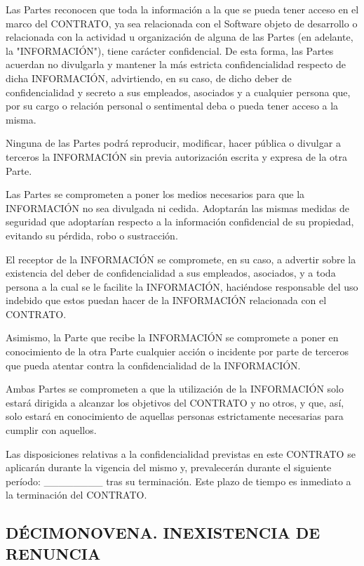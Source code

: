 \documentclass[a4paper,11pt]{report}
\begin{document}
	Las Partes reconocen que toda la información a la que se pueda tener
	acceso en el marco del CONTRATO, ya sea relacionada con el Software
	objeto de desarrollo o relacionada con la actividad u organización de
	alguna de las Partes (en adelante, la "{INFORMACIÓN}"), tiene carácter
	confidencial. De esta forma, las Partes acuerdan no divulgarla y
	mantener la más estricta confidencialidad respecto de dicha INFORMACIÓN,
	advirtiendo, en su caso, de dicho deber de confidencialidad y secreto a
	sus empleados, asociados y a cualquier persona que, por su cargo o
	relación personal o sentimental deba o pueda tener acceso a la misma.

	Ninguna de las Partes podrá reproducir, modificar, hacer pública o
	divulgar a terceros la INFORMACIÓN sin previa autorización escrita y
	expresa de la otra Parte.

	Las Partes se comprometen a poner los medios necesarios para que la
	INFORMACIÓN no sea divulgada ni cedida. Adoptarán las mismas medidas de
	seguridad que adoptarían respecto a la información confidencial de su
	propiedad, evitando su pérdida, robo o sustracción.

	El receptor de la INFORMACIÓN se compromete, en su caso, a advertir
	sobre la existencia del deber de confidencialidad a sus empleados,
	asociados, y a toda persona a la cual se le facilite la INFORMACIÓN,
	haciéndose responsable del uso indebido que estos puedan hacer de la
	INFORMACIÓN relacionada con el CONTRATO.

	Asimismo, la Parte que recibe la INFORMACIÓN se compromete a poner en
	conocimiento de la otra Parte cualquier acción o incidente por parte de
	terceros que pueda atentar contra la confidencialidad de la INFORMACIÓN.

	Ambas Partes se comprometen a que la utilización de la INFORMACIÓN solo
	estará dirigida a alcanzar los objetivos del CONTRATO y no otros, y que,
	así, solo estará en conocimiento de aquellas personas estrictamente
	necesarias para cumplir con aquellos.

	Las disposiciones relativas a la confidencialidad previstas en este
	CONTRATO se aplicarán durante la vigencia del mismo y, prevalecerán
	durante el siguiente período: \_\_\_\_\_\_\_\_ tras su terminación.
	Este plazo de tiempo es inmediato a la terminación del CONTRATO.

	\subsection*{DÉCIMONOVENA. INEXISTENCIA DE RENUNCIA}
\end{document}
